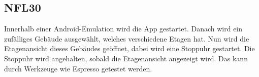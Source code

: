 \subsection*{NFL30}

Innerhalb einer \Gls{Android}-\Gls{Emulation} wird die App gestartet.
Danach wird ein zufälliges Gebäude ausgewählt, welches verschiedene Etagen hat.
Nun wird die \Gls{Etagenansicht} dieses Gebäudes geöffnet, dabei wird eine Stoppuhr gestartet.
Die Stoppuhr wird angehalten, sobald die \Gls{Etagenansicht} angezeigt wird.
Das kann durch Werkzeuge wie \Gls{Espresso} getestet werden.